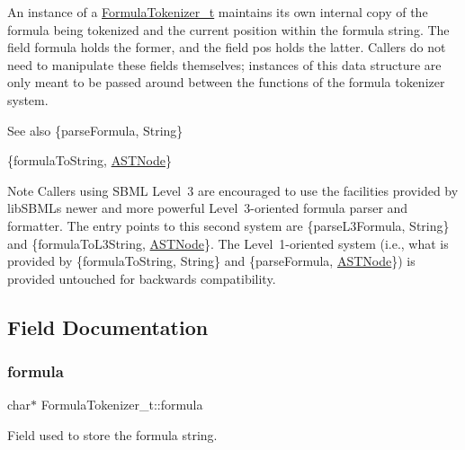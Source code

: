 An instance of a \hyperlink{struct_formula_tokenizer__t}{Formula\+Tokenizer\+\_\+t} maintains its own internal copy of the formula being tokenized and the current position within the formula string. The field {\ttfamily formula} holds the former, and the field {\ttfamily pos} holds the latter. Callers do not need to manipulate these fields themselves; instances of this data structure are only meant to be passed around between the functions of the formula tokenizer system.

\begin{DoxySeeAlso}{See also}
\{parse\+Formula, String\} 

\{formula\+To\+String, \hyperlink{class_a_s_t_node}{A\+S\+T\+Node}\}
\end{DoxySeeAlso}
\begin{DoxyNote}{Note}
Callers using S\+B\+ML Level~3 are encouraged to use the facilities provided by lib\+S\+B\+ML\textquotesingle{}s newer and more powerful Level~3-\/oriented formula parser and formatter. The entry points to this second system are \{parse\+L3\+Formula, String\} and \{formula\+To\+L3\+String, \hyperlink{class_a_s_t_node}{A\+S\+T\+Node}\}. The Level~1-\/oriented system (i.\+e., what is provided by \{formula\+To\+String, String\} and \{parse\+Formula, \hyperlink{class_a_s_t_node}{A\+S\+T\+Node}\}) is provided untouched for backwards compatibility. 
\end{DoxyNote}


\subsection{Field Documentation}
\mbox{\label{struct_formula_tokenizer__t_afaa9d07f8beb33c3ca95257cdaf143a2}} 
\subsubsection{\texorpdfstring{formula}{formula}}
{\footnotesize\ttfamily char$\ast$ Formula\+Tokenizer\+\_\+t\+::formula}

Field used to store the formula string. \mbox{\label{struct_formula_tokenizer__t_aafb61b7f290b097afdc29c4ae707431b}} 
